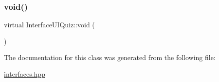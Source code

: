\subsubsection{\texorpdfstring{void()}{void()}}
{\footnotesize\ttfamily virtual Interface\+U\+I\+Quiz\+::void (\begin{DoxyParamCaption}\item[{answer\+Quiz(\hyperlink{class_user}{User} $\ast$)}]{ }\end{DoxyParamCaption})\hspace{0.3cm}{\ttfamily [pure virtual]}}



The documentation for this class was generated from the following file\+:\begin{DoxyCompactItemize}
\item 
\hyperlink{interfaces_8hpp}{interfaces.\+hpp}\end{DoxyCompactItemize}
